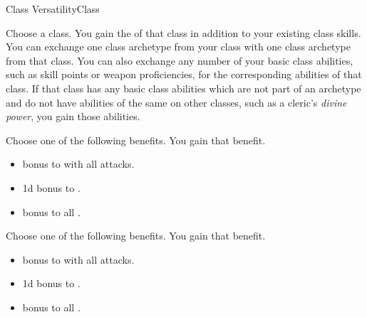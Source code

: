     \begin{feat}{Class Versatility}{Class}
        \featben

         Choose a class.
        You gain the  of that class in addition to your existing class skills.
        You can exchange one class archetype from your class with one class archetype from that class.
        You can also exchange any number of your basic class abilities, such as skill points or weapon proficiencies, for the corresponding abilities of that class.
        If that class has any basic class abilities which are not part of an archetype and do not have abilities of the same on other classes, such as a cleric's \textit{divine power}, you gain those abilities.

         Choose one of the following benefits.
        You gain that benefit.
        \begin{itemize}
            \item {} bonus to  with all attacks.
            \item \plus1d bonus to .
            \item {} bonus to all .
        \end{itemize}

         Choose one of the following benefits.
        You gain that benefit.
        \begin{itemize}
            \item {} bonus to  with all attacks.
            \item \plus1d bonus to .
            \item {} bonus to all .
        \end{itemize}
    \end{feat}

